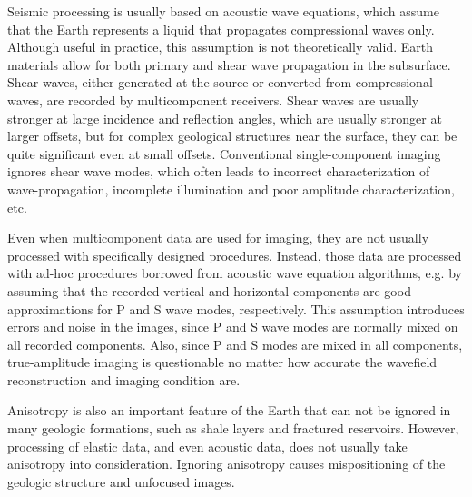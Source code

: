 
Seismic processing is usually based on acoustic wave equations, which assume that the Earth represents a liquid that propagates compressional waves only. Although useful in practice, this assumption is not theoretically valid.
Earth materials allow for both primary and shear wave propagation in the subsurface. Shear waves, either generated at the source or converted from compressional waves, are recorded by multicomponent receivers.  Shear waves are usually stronger at large incidence and reflection angles, which are usually stronger at larger offsets, but for complex geological structures near the surface, they can be quite significant even at small offsets.
Conventional single-component imaging ignores shear wave modes, which often leads to incorrect characterization of wave-propagation, incomplete illumination and poor amplitude characterization, etc.


Even when multicomponent data are used for imaging, they are not usually processed with specifically designed procedures. Instead, those data are processed with ad-hoc procedures borrowed from acoustic wave equation algorithms, e.g. by assuming that the recorded vertical and horizontal components are good approximations for P and S wave modes, respectively. This assumption introduces errors and noise in the images, since P and S wave modes are normally mixed on all recorded components. Also, since P and S modes are mixed in all components, true-amplitude imaging is questionable no matter how accurate the wavefield reconstruction and imaging condition are.

Anisotropy is also an important feature of the Earth that can not be ignored in many geologic formations, such as shale layers and fractured reservoirs. However, processing of elastic data, and even acoustic data, does not usually take anisotropy into consideration. Ignoring anisotropy causes mispositioning of the geologic structure and unfocused images. 

